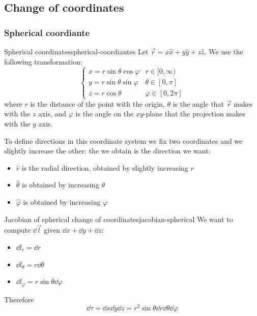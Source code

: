 \documentclass[12pt]{extarticle}
\begin{document}
\subsection{Change of coordinates}

\subsubsection{Spherical coordiante}

\begin{definition}{Spherical coordinates}{spherical-coordiantes}
	Let $\vec r = x \hat x + y \hat y + z \hat z$.
	We use the following transformation:
	\begin{equation}
		\begin{cases}
			x = r \sin \theta \cos \varphi & r \in [0, \infty)     \\
			y = r \sin \theta \sin \varphi & \theta \in [0, \pi]   \\
			z = r \cos \theta              & \varphi \in [0, 2\pi]
		\end{cases}
	\end{equation}
	where $r$ is the distance of the point with the origin, $\theta$ is the angle that $\vec r$ makes with the $z$ axis, and $\varphi$ is the angle on the $xy$-plane that the projection makes with the $y$ axis.
\end{definition}

To define directions in this coordinate system we fix two coordinates and we slightly increase the other: the  we obtain is the direction we want:
\begin{itemize}
	\item $\hat r$ is the radial direction, obtained by slightly increasing $r$
	\item $\hat \theta$ is obtained by increasing $\theta$
	\item $\hat \varphi$ is obtained by increasing $\varphi$
\end{itemize}

\begin{proposition}{Jacobian of spherical change of coordinates}{jacobian-spherical}
	We want to compute $\dd{\vec l}$ given $\dd{x} + \dd{y} + \dd{z}$:
	\begin{itemize}
		\item $\dd{l}_r = \dd{r}$
		\item $\dd{l}_\theta = r \dd{\theta}$
		\item $\dd{l}_\varphi = r \sin \theta \dd{\varphi}$
	\end{itemize}

	Therefore
	\begin{equation}
		\dd{\tau} = \dd{x} \dd{y} \dd{z} = r^2 \sin \theta \dd{r} \dd{\theta} \dd{\varphi}
	\end{equation}
\end{proposition}
\end{document}
